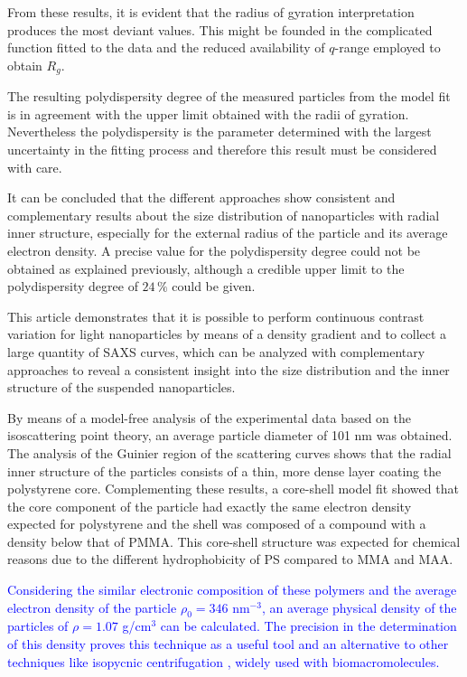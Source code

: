 From these results, it is evident that the radius of gyration interpretation produces the most deviant values. This might be founded in the complicated function fitted to the data and the reduced availability of $q$-range employed to obtain \( R_g \).

The resulting polydispersity degree of the measured particles from the model fit is in agreement with the upper limit obtained with the radii of gyration. Nevertheless the polydispersity is the parameter determined with the largest uncertainty in the fitting process and therefore this result must be considered with care.

It can be concluded that the different approaches show consistent and complementary results about the size distribution of nanoparticles with radial inner structure, especially for the external radius of the particle and its average electron density. A precise value for the polydispersity degree could not be obtained as explained previously, although a credible upper limit to the polydispersity degree of $24\,\%$ could be given.

This article demonstrates that it is possible to perform continuous contrast variation for light nanoparticles by means of a density gradient and to collect a large quantity of SAXS curves, which can be analyzed with complementary approaches to reveal a consistent insight into the size distribution and the inner structure of the suspended nanoparticles. 

By means of a model-free analysis of the experimental data based on the isoscattering point theory, an average particle diameter of 101 nm was obtained. The analysis of the Guinier region of the scattering curves shows that the radial inner structure of the particles consists of a thin, more dense layer coating the polystyrene core. Complementing these results, a core-shell model fit showed that the core component of the particle had exactly the same electron density expected for polystyrene and the shell was composed of a compound with a density below that of PMMA. This core-shell structure was expected for chemical reasons due to the different hydrophobicity of PS compared to MMA and MAA.

\textcolor{blue}{Considering the similar electronic composition of these polymers and the average electron density of the particle $\rho_0=346$ nm\(^{-3}\), an average physical density of the particles of $\rho=1.07$ g/cm\(^{3}\) can be calculated. The precision in the determination of this density proves this technique as a useful tool and an alternative to other techniques like isopycnic centrifugation \cite{vauthier_measurement_1999,arnold_sorting_2006,sun_separation_2009}, widely used with biomacromolecules.}

